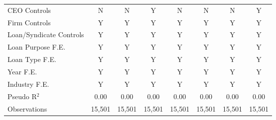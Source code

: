 {\begin{tabular}{l*{7}{c}}
\midrule CEO Controls    &        N         &        N         &        Y         &        N         &        N         &        N         &        Y         \\
Firm Controls   &        Y         &        Y         &        Y         &        Y         &        Y         &        Y         &        Y         \\
Loan/Syndicate Controls&        Y         &        Y         &        Y         &        Y         &        Y         &        Y         &        Y         \\
Loan Purpose F.E.&        Y         &        Y         &        Y         &        Y         &        Y         &        Y         &        Y         \\
Loan Type F.E.  &        Y         &        Y         &        Y         &        Y         &        Y         &        Y         &        Y         \\
Year F.E.       &        Y         &        Y         &        Y         &        Y         &        Y         &        Y         &        Y         \\
Industry F.E.   &        Y         &        Y         &        Y         &        Y         &        Y         &        Y         &        Y         \\

Pseudo R$ ^2 $  &     0.00         &     0.00         &     0.00         &     0.00         &     0.00         &     0.00         &     0.00         \\
Observations    &   15,501         &   15,501         &   15,501         &   15,501         &   15,501         &   15,501         &   15,501         \\
\bottomrule
\end{tabular}
}
